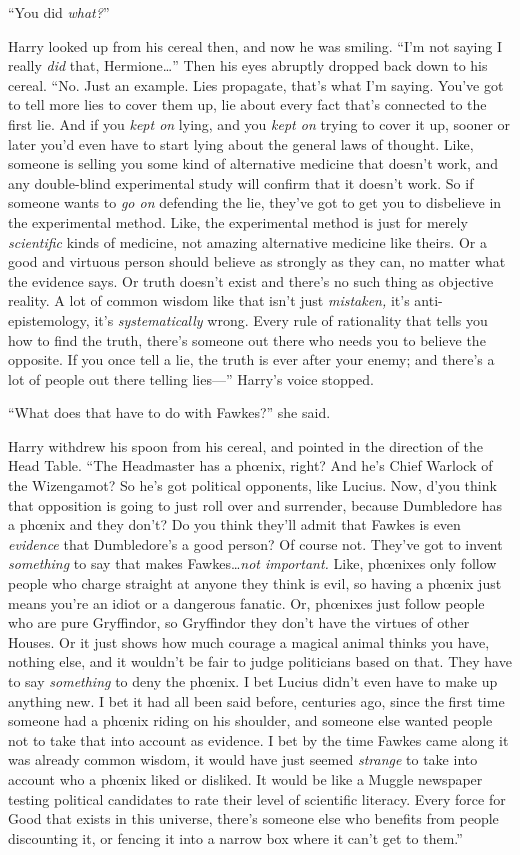 “You did \emph{what?}”

Harry looked up from his cereal then, and now he was smiling. “I’m not saying I really \emph{did} that, Hermione…” Then his eyes abruptly dropped back down to his cereal. “No. Just an example. Lies propagate, that’s what I’m saying. You’ve got to tell more lies to cover them up, lie about every fact that’s connected to the first lie. And if you \emph{kept on} lying, and you \emph{kept on} trying to cover it up, sooner or later you’d even have to start lying about the general laws of thought. Like, someone is selling you some kind of alternative medicine that doesn’t work, and any double-blind experimental study will confirm that it doesn’t work. So if someone wants to \emph{go on} defending the lie, they’ve got to get you to disbelieve in the experimental method. Like, the experimental method is just for merely \emph{scientific} kinds of medicine, not amazing alternative medicine like theirs. Or a good and virtuous person should believe as strongly as they can, no matter what the evidence says. Or truth doesn’t exist and there’s no such thing as objective reality. A lot of common wisdom like that isn’t just \emph{mistaken,} it’s anti-epistemology, it’s \emph{systematically} wrong. Every rule of rationality that tells you how to find the truth, there’s someone out there who needs you to believe the opposite. If you once tell a lie, the truth is ever after your enemy; and there’s a lot of people out there telling lies—” Harry’s voice stopped.

“What does that have to do with Fawkes?” she said.

Harry withdrew his spoon from his cereal, and pointed in the direction of the Head Table. “The Headmaster has a phœnix, right? And he’s Chief Warlock of the Wizengamot? So he’s got political opponents, like Lucius. Now, d’you think that opposition is going to just roll over and surrender, because Dumbledore has a phœnix and they don’t? Do you think they’ll admit that Fawkes is even \emph{evidence} that Dumbledore’s a good person? Of course not. They’ve got to invent \emph{something} to say that makes Fawkes…\emph{not important.} Like, phœnixes only follow people who charge straight at anyone they think is evil, so having a phœnix just means you’re an idiot or a dangerous fanatic. Or, phœnixes just follow people who are pure Gryffindor, so Gryffindor they don’t have the virtues of other Houses. Or it just shows how much courage a magical animal thinks you have, nothing else, and it wouldn’t be fair to judge politicians based on that. They have to say \emph{something} to deny the phœnix. I bet Lucius didn’t even have to make up anything new. I bet it had all been said before, centuries ago, since the first time someone had a phœnix riding on his shoulder, and someone else wanted people not to take that into account as evidence. I bet by the time Fawkes came along it was already common wisdom, it would have just seemed \emph{strange} to take into account who a phœnix liked or disliked. It would be like a Muggle newspaper testing political candidates to rate their level of scientific literacy. Every force for Good that exists in this universe, there’s someone else who benefits from people discounting it, or fencing it into a narrow box where it can’t get to them.”


